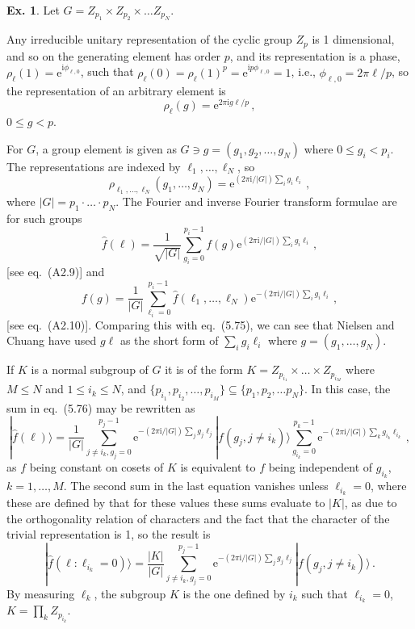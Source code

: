 \documentclass[a4paper,12pt]{article}
\def\e{\mathrm{e}}
\def\imagi{\mathrm{i}}
\theoremstyle{definition}
\newtheorem{exercise}{Ex.}[section]
\begin{document}
\begin{exercise}\label{ex:hiddenSubgroup1}
 Let $G=Z_{p_1}\times Z_{p_2}\times \dots Z_{p_N}$.
 
 Any irreducible unitary representation of the cyclic group $Z_p$ is 1 dimensional, and so on the generating element has order $p$, and its representation is a phase, $\rho_\ell(1)=\e^{\imagi \phi_{\ell, 0}}$, such that $\rho_\ell(0)=\rho_\ell(1)^p=\e^{\imagi p\phi_{\ell,0}} = 1$, i.e., $\phi_{\ell,0}=2\pi\ell/p$, so the representation of an arbitrary element is
 \[
  \rho_\ell(g)=\e^{2\pi\imagi g \ell/p}\,,
 \]
 $0\le g < p$.
  
 For $G$, a group element is given as $G\ni g = (g_1,g_2, \dots, g_N)$ where $0\le g_i < p_i$. The representations are indexed by $\ell_1, \dots, \ell_N$, so
 \[
  \rho_{\ell_1,\dots, \ell_N}(g_1, \dots, g_N) = \e^{(2\pi\imagi/|G|) \sum_i g_i \ell_i}\,,
 \]
 where $|G|=p_1 \cdot \dots \cdot p_N$. The Fourier and inverse Fourier transform formulae are for such groups
 \[
  \hat{f}(\ell) = \frac{1}{\sqrt{|G|}}\sum_{g_i=0}^{p_i-1} f(g) \e^{(2\pi\imagi/|G|)\sum_i g_i \ell_i}\,,
 \]
 [see eq.~(A2.9)] and
 \[
  f(g) = \frac{1}{|G|} \sum_{\ell_i=0}^{p_i-1}\hat{f}(\ell_1,\dots,\ell_N) \e^{-(2\pi\imagi/|G|)\sum_i g_i \ell_i}\,,
 \]
 [see eq.~(A2.10)]. Comparing this with eq.~(5.75), we can see that Nielsen and Chuang have used $g\ell$ as the short form of $\sum_i g_i \ell_i$ where $g=(g_1,\dots,g_N)$.
 
 If $K$ is a normal subgroup of $G$ it is of the form $K=Z_{p_{i_1}}\times \dots \times Z_{p_{i_M}}$ where $M\le N$ and $1\le i_k \le N$, and $\{p_{i_1}, p_{i_2}, \dots, p_{i_M}\} \subseteq \{ p_1, p_2, \dots p_N\}$. In this case, the sum in eq.~(5.76) may be rewritten as
 \[
  |\hat{f}(\ell)\rangle = \frac{1}{|G|}\sum_{j\ne i_k,g_j=0}^{p_j-1}\e^{-(2\pi\imagi/|G|)\sum_j g_j \ell_j}|f(g_j, j\ne i_k)\rangle \sum_{g_{i_k}=0}^{p_k-1}\e^{-(2\pi\imagi/|G|)\sum_k g_{i_k}\ell_{i_k}}\,,
 \]
 as $f$ being constant on cosets of $K$ is equivalent to $f$ being independent of $g_{i_k}$, $k=1,\dots,M$. The second sum in the last equation vanishes unless $\ell_{i_k}=0$, where these are defined by that for these values these sums evaluate to $|K|$, as due to the orthogonality relation of characters and the fact that the character of the trivial representation is 1,
 so the result is
 \[
  |\hat{f}(\ell: \ell_{i_k}=0)\rangle = \frac{|K|}{|G|}\sum_{j\ne i_k,g_j=0}^{p_j-1}\e^{-(2\pi\imagi/|G|)\sum_j g_j \ell_j}|f(g_j, j\ne i_k)\rangle\,.
 \]
 By measuring $\ell_k$, the subgroup $K$ is the one defined by $i_k$ such that $\ell_{i_k}=0$, $K=\prod_k Z_{p_{i_k}}$.
\end{exercise}
\end{document}
